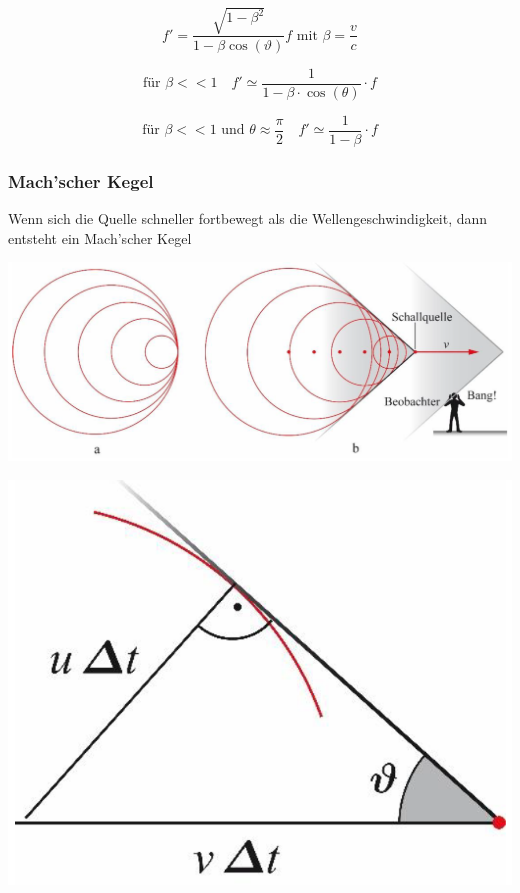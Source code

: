 $$ \boxed{f' = \frac{\sqrt{1-\beta^2}}{1 - \beta \cos(\vartheta)}f \text{ mit } \beta = \frac{v}{c} } $$


$$ \text{für } \beta << 1 \quad f' \simeq \frac{1}{1- \beta \cdot \cos(\theta)} \cdot f  $$

$$ \text{für } \beta << 1 \text{ und } \theta \approx \frac{\pi}{2} \quad f' \simeq \frac{1}{1- \beta } \cdot f $$



\subsubsection{Mach'scher Kegel}
Wenn sich die Quelle schneller fortbewegt als die Wellengeschwindigkeit, dann entsteht ein Mach'scher Kegel \\



\begin{minipage}{0.6\linewidth}
\includegraphics[width=0.95\linewidth]{Bilder/Wellen-Optik/machkegel_1} \\
\end{minipage}
\hfill
\begin{minipage}{0.38\linewidth}
\includegraphics[width=0.95\linewidth]{Bilder/Wellen-Optik/machkegel_2} \\
\end{minipage}


